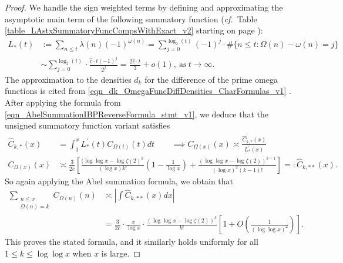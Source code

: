 \documentclass[11pt,reqno,a4letter]{article}
\numberwithin{figure}{section}
\numberwithin{table}{section}
\newcommand{\cf}{\textit{cf.\ }}
\theoremstyle{plain}
\numberwithin{theorem}{section}
\theoremstyle{definition}
\begin{document}
\begin{proof}
We handle the sign weighted terms by defining and approximating the asymptotic main term 
of the following summatory function 
(\cf Table \ref{table_LAstxSummatoryFuncCompsWithExact_v2} starting on page 
\pageref{table_LAstxSummatoryFuncCompsWithExact_v2}): 
\begin{align*} 
L_{\ast}(t) & := \sum_{n \leq t} \lambda(n) (-1)^{\omega(n)} = 
     \sum_{j=0}^{\log_2(t)} (-1)^{j} \cdot \#\{n \leq t: \Omega(n) - \omega(n) = j\} \\ 
     & \sim \sum_{j=0}^{\log_2(t)} \cdot \frac{\hat{c} \cdot t (-1)^{j}}{2^j} = 
     \frac{2\hat{c} \cdot t}{3} + o(1), \mathrm{\ as\ } t \rightarrow \infty. 
\end{align*} 
The approximation to the densities $d_k$ for the difference of the prime omega 
functions is cited from 
\eqref{eqn_dk_OmegaFuncDiffDensities_CharFormulas_v1} \cite[\S 2.4]{MV}. 
After applying the formula from \eqref{eqn_AbelSummationIBPReverseFormula_stmt_v1},  
we deduce that the unsigned summatory function variant satisfies 
\begin{align*} 
\widehat{C}_{k,\ast}(x) & = \int_1^{x} L_{\ast}^{\prime}(t) C_{\Omega(t)}(t) dt \qquad \implies 
C_{\Omega(x)}(x) \asymp \frac{\widehat{C}_{k,\ast}^{\prime}(x)}{L_{\ast}^{\prime}(x)} \\ 
C_{\Omega(x)}(x) & \asymp \frac{3}{2\hat{c}} \left[\frac{(\log\log x - \log\zeta(2)^{k}}{(\log x) k!} \left(1 - 
     \frac{1}{\log x}\right) + \frac{(\log\log x - \log\zeta(2))^{k-1}}{(\log x)^2 (k-1)!}\right] 
     =: \widehat{C}_{k,\ast\ast}(x). 
\end{align*} 
So again applying the Abel summation formula, we obtain that 
\begin{align*} 
\sum_{\substack{n \leq x \\ \Omega(n)=k}} C_{\Omega(n)}(n) & \asymp 
     \left\lvert \int \widehat{C}_{k,\ast\ast}(x) dx \right\rvert \\ 
     & = \frac{3}{2\hat{c}} \cdot \frac{x}{\log x} \cdot 
     \frac{(\log\log x - \log\zeta(2))^{k}}{k!} \left[1 + O\left(\frac{1}{(\log\log x)^2}\right) 
     \right]. 
\end{align*} 
This proves the stated formula, and it similarly holds uniformly for all $1 \leq k \leq \log\log x$ 
when $x$ is large. 
\end{proof}
\end{document}
